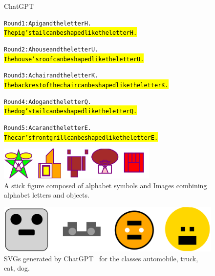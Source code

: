 \begin{figure}[H]
\begin{AIbox}{ChatGPT}
{\begin{alltt}
Round 1: A pig and the letter H. \\
\hl{The pig's tail can be shaped like the letter H.}

Round 2: A house and the letter U. \\
\hl{The house's roof can be shaped like the letter U.}

Round 3: A chair and the letter K. \\
\hl{The backrest of the chair can be shaped like the letter K.}

Round 4: A dog and the letter Q. \\
\hl{The dog's tail can be shaped like the letter Q.}

Round 5: A car and the letter E. \\
\hl{The car's front grill can be shaped like the letter E.}
\end{alltt}
}
\begin{center}
\includegraphics[width=0.7\textwidth]{Section 2/letters_objects2.png}
\end{center}
\end{AIbox}
	\caption{A stick figure composed of alphabet symbols and Images combining alphabet letters and objects.}
	\label{fig:visionchatgpt}
\end{figure}
\begin{figure}[h]
	\centering
	\includegraphics[height=0.16\textwidth]{Section 2/cifar2.png}
	\caption{SVGs generated by ChatGPT \ for the classes automobile, truck, cat, dog.}
	\label{fig:2dchat}
\end{figure}
